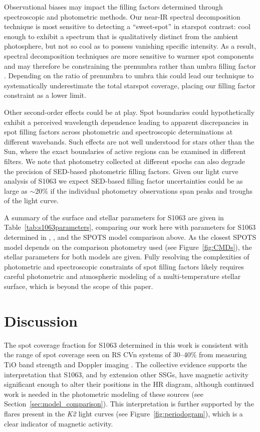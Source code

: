 \documentclass[twocolumn,tighten]{aastex631}
\begin{document}
Observational biases may impact the filling factors determined through spectroscopic and photometric methods. Our near-IR spectral decomposition technique is most sensitive to detecting a ``sweet-spot'' in starspot contrast: cool enough to exhibit a spectrum that is qualitatively distinct from the ambient photosphere, but not so cool as to possess vanishing specific intensity.  As a result, spectral decomposition techniques are more sensitive to warmer spot components and may therefore be constraining the prenumbra rather than umbra filling factor \citep{1981ApJ...250..327V}. Depending on the ratio of prenumbra to umbra this could lead our technique to systematically underestimate the total starspot coverage, placing our filling factor constraint as a lower limit.  

Other second-order effects could be at play.  Spot boundaries could hypothetically exhibit a perceived wavelength dependence leading to apparent discrepancies in spot filling factors across photometric and spectroscopic determinations at different wavebands.  Such effects are not well understood for stars other than the Sun, where the exact boundaries of active regions can be examined in different filters.  We note that photometry collected at different epochs can also degrade the precision of SED-based photometric filling factors. Given our light curve analysis of S1063 we expect SED-based filling factor uncertainties could be as large as $\sim$20\% if the individual photometry observations span peaks and troughs of the light curve.

A summary of the surface and stellar parameters for S1063 are given in Table~\ref{tab:s1063parameters}, comparing our work here with parameters for S1063 determined in \citet{mathieu03}, \citet{leiner17}, and the SPOTS model comparison above. As the closest SPOTS model depends on the comparison photometry used (see Figure~\ref{fig:CMDs}), the stellar parameters for both models are given.  Fully resolving the complexities of photometric and spectroscopic constraints of spot filling factors likely requires careful photometric and atmospheric modeling of a multi-temperature stellar surface, which is beyond the scope of this paper. 


\section{Discussion}
\label{sec:discussion}

The spot coverage fraction for S1063 determined in this work is consistent with the range of spot coverage seen on RS CVn systems of 30--40\% from measuring TiO band strength \citep{oneal96, oneal98, oneal04} and Doppler imaging \citep{hackman12}. The collective evidence supports the interpretation that S1063, and by extension other SSGs, have magnetic activity significant enough to alter their positions in the HR diagram, although continued work is needed in the photometric modeling of these sources (see Section~\ref{sec:model_comparison}). This interpretation is further supported by the flares present in the \emph{K2} light curves (see Figure~\ref{fig:periodogram}), which is a clear indicator of magnetic activity.
\end{document}
